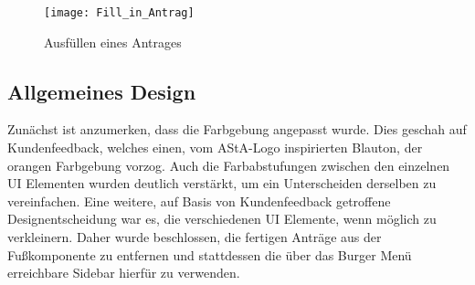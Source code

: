 \begin{figure}[h]
\centering
\texttt{[image: Fill\_in\_Antrag]}
\caption{Ausfüllen eines Antrages}\label{Ausfüllen eines Antrages}
\end{figure}

\subsection{Allgemeines Design}\label{Allgemeines Design}
Zunächst ist anzumerken, dass die Farbgebung angepasst wurde. Dies geschah auf
Kundenfeedback, welches einen, vom AStA-Logo inspirierten Blauton, der orangen
Farbgebung vorzog. Auch die Farbabstufungen zwischen den einzelnen \ac{UI} Elementen
wurden deutlich verstärkt, um ein Unterscheiden derselben zu vereinfachen.
Eine weitere, auf Basis von Kundenfeedback getroffene Designentscheidung war es, die
verschiedenen \ac{UI} Elemente, wenn möglich zu verkleinern. Daher wurde beschlossen, die
fertigen Anträge aus der Fußkomponente zu entfernen und stattdessen die über das Burger
Menü erreichbare Sidebar hierfür zu verwenden.


